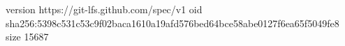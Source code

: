 version https://git-lfs.github.com/spec/v1
oid sha256:5398c531c53c9f02baca1610a19afd576bed64bce58abe0127f6ea65f5049fe8
size 15687
